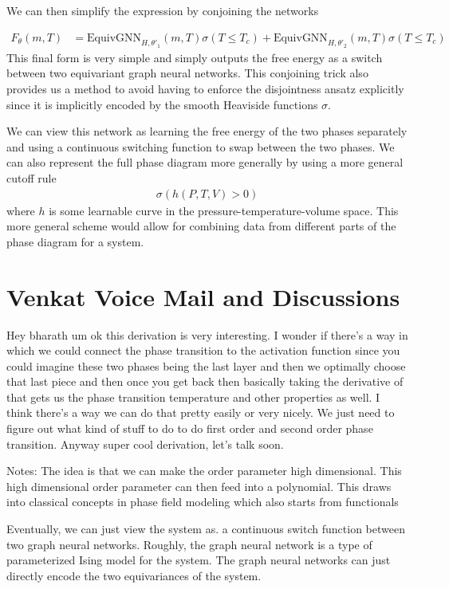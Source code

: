 \documentclass[book.tex]{subfiles}
\begin{document}
We can then simplify the expression by conjoining the networks

\begin{align}
F_\theta(m, T) &= \textrm{EquivGNN}_{H,\theta'_1}(m, T)\sigma(T \leq T_c)+ \textrm{EquivGNN}_{H,\theta'_2}(m, T)\sigma(T \leq T_c)
\end{align}
This final form is very simple and simply outputs the free energy as a switch between two equivariant graph neural networks. This conjoining trick also provides us a method to avoid having to enforce the disjointness ansatz explicitly since it is implicitly encoded by the smooth Heaviside functions $\sigma$.

We can view this network as learning the free energy of the two phases separately and using a continuous switching function to swap between the two phases. We can also represent the full phase diagram more generally by using a more general cutoff rule
\begin{align}
\sigma(h(P, T, V) > 0)
\end{align}
where $h$ is some learnable curve in the pressure-temperature-volume space. This more general scheme would allow for combining data from different parts of the phase diagram for a system.
\section{Venkat Voice Mail and Discussions}

Hey bharath um ok this derivation is very interesting. I wonder if there's a way in which we could connect the phase transition to the activation function since you could imagine these two phases being the last layer and then we optimally choose that last piece and then once you get back then basically taking the derivative of that gets us the phase transition temperature and other properties as well. I think there's a way we can do that pretty easily or very nicely. We just need to figure out what kind of stuff to do to do first order and second order phase transition. Anyway super cool derivation, let's talk soon.


Notes: The idea is that we can make the order parameter high dimensional. This high dimensional order parameter can then feed into a polynomial. This draws into classical concepts in phase field modeling which also starts from functionals

Eventually, we can just view the system as. a continuous switch function between two graph neural networks. Roughly, the graph neural network is a type of parameterized Ising model for the system. The graph neural networks can just directly encode the two equivariances of the system.
\end{document}
